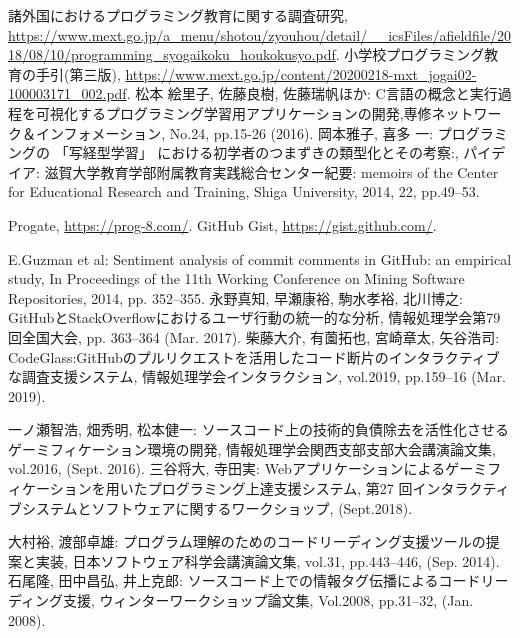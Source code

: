 \begin{thebibliography}{99}
	
	諸外国におけるプログラミング教育に関する調査研究, \url{https://www.mext.go.jp/a_menu/shotou/zyouhou/detail/__icsFiles/afieldfile/2018/08/10/programming_syogaikoku_houkokusyo.pdf}.
	小学校プログラミング教育の手引(第三版), \url{https://www.mext.go.jp/content/20200218-mxt_jogai02-100003171_002.pdf}.
	松本 絵里子, 佐藤良樹, 佐藤瑞帆ほか: C言語の概念と実行過程を可視化するプログラミング学習用アプリケーションの開発,専修ネットワーク＆インフォメーション, No.24, pp.15-26 (2016).
	岡本雅子, 喜多 一: プログラミングの 「写経型学習」 における初学者のつまずきの類型化とその考察:, パイデイア: 滋賀大学教育学部附属教育実践総合センター紀要: memoirs of the Center for Educational Research and Training, Shiga University, 2014, 22, pp.49--53.
	
	Progate, \url{https://prog-8.com/}.
	GitHub Gist, \url{https://gist.github.com/}.



	E.Guzman et al: Sentiment analysis of commit comments in GitHub: an empirical study, In Proceedings of the 11th Working Conference on Mining Software Repositories, 2014, pp. 352--355.
	永野真知, 早瀬康裕, 駒水孝裕, 北川博之: GitHubとStackOverflowにおけるユーザ行動の統一的な分析, 情報処理学会第79回全国大会, pp. 363–364 (Mar. 2017).
	柴藤大介, 有薗拓也, 宮崎章太, 矢谷浩司: CodeGlass:GitHubのプルリクエストを活用したコード断片のインタラクティブな調査支援システム, 情報処理学会インタラクション, vol.2019, pp.159–16 (Mar. 2019).

	一ノ瀬智浩, 畑秀明, 松本健一: ソースコード上の技術的負債除去を活性化させるゲーミフィケーション環境の開発, 情報処理学会関西支部支部大会講演論文集, vol.2016, (Sept. 2016).
	三谷将大, 寺田実: Webアプリケーションによるゲーミフィケーションを用いたプログラミング上達支援システム, 第27 回インタラクティブシステムとソフトウェアに関するワークショップ, (Sept.2018).


	大村裕, 渡部卓雄: プログラム理解のためのコードリーディング支援ツールの提案と実装, 日本ソフトウェア科学会講演論文集, vol.31, pp.443–446, (Sep. 2014).
	石尾隆, 田中昌弘, 井上克郎: ソースコード上での情報タグ伝播によるコードリーディング支援, ウィンターワークショップ論文集, Vol.2008, pp.31–32, (Jan. 2008).


\end{thebibliography}
